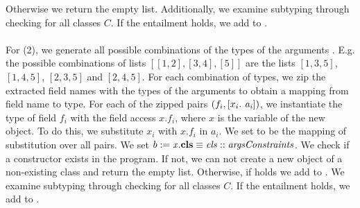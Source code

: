 Otherwise we return the empty list.
Additionally, we examine subtyping through
checking  for all classes $C$.
If the entailment holds, we add  to .\\
\\
For (2), we generate all possible combinations
of the types of the arguments .
E.g. the possible combinations of lists $[[1, 2], [3, 4], [5]]$
are the lists $[1, 3, 5]$, $[1, 4, 5]$, $[2, 3, 5]$ and $[2, 4, 5]$.
For each combination of types,
we zip the extracted field names
with the types of the arguments
to obtain a mapping from field name to type.
For each of the zipped pairs $(f_i, [x_i.\ \mathit{a_i}])$,
we instantiate the type of field $f_i$
with the field access $x.f_i$,
where $x$ is the variable of the new object.
To do this, we substitute $x_i$ with $x.f_i$ in $a_i$.
We set  to be the mapping of
substitution  over all pairs.
We set $b := \mathit{x}.\textbf{cls} \equiv \mathit{cls} :: \mathit{argsConstraints}$.
We check if a constructor 
exists in the program.
If not, we can not create a new object of a non-existing class
and return the empty list.
Otherwise, if 
holds we add  to .
We examine subtyping through
checking  for all classes $C$.
If the entailment holds, we add  to .


